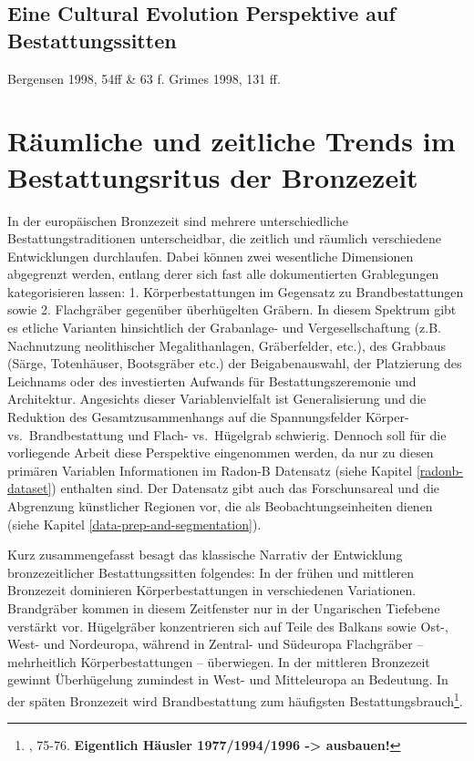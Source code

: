 \documentclass[openany,twoside,twocolumn]{book}
\let\rmarkdownfootnote\footnote%
\def\footnote{\protect\rmarkdownfootnote}
\begin{document}
\hypertarget{eine-cultural-evolution-perspektive-auf-bestattungssitten}{%
\subsection{Eine Cultural Evolution Perspektive auf
Bestattungssitten}\label{eine-cultural-evolution-perspektive-auf-bestattungssitten}}

Bergensen 1998, 54ff \& 63 f. Grimes 1998, 131 ff.

\hypertarget{raumliche-und-zeitliche-trends-im-bestattungsritus-der-bronzezeit}{%
\section{Räumliche und zeitliche Trends im Bestattungsritus der
Bronzezeit}\label{raumliche-und-zeitliche-trends-im-bestattungsritus-der-bronzezeit}}

In der europäischen Bronzezeit sind mehrere unterschiedliche
Bestattungstraditionen unterscheidbar, die zeitlich und räumlich
verschiedene Entwicklungen durchlaufen. Dabei können zwei wesentliche
Dimensionen abgegrenzt werden, entlang derer sich fast alle
dokumentierten Grablegungen kategorisieren lassen: 1. Körperbestattungen
im Gegensatz zu Brandbestattungen sowie 2. Flachgräber gegenüber
überhügelten Gräbern. In diesem Spektrum gibt es etliche Varianten
hinsichtlich der Grabanlage- und Vergesellschaftung (z.B. Nachnutzung
neolithischer Megalithanlagen, Gräberfelder, etc.), des Grabbaus (Särge,
Totenhäuser, Bootsgräber etc.) der Beigabenauswahl, der Platzierung des
Leichnams oder des investierten Aufwands für Bestattungszeremonie und
Architektur. Angesichts dieser Variablenvielfalt ist Generalisierung und
die Reduktion des Gesamtzusammenhangs auf die Spannungsfelder Körper-
vs.~Brandbestattung und Flach- vs.~Hügelgrab schwierig. Dennoch soll für
die vorliegende Arbeit diese Perspektive eingenommen werden, da nur zu
diesen primären Variablen Informationen im Radon-B Datensatz (siehe
Kapitel \ref{radonb-dataset}) enthalten sind. Der Datensatz gibt auch
das Forschunsareal und die Abgrenzung künstlicher Regionen vor, die als
Beobachtungseinheiten dienen (siehe Kapitel
\ref{data-prep-and-segmentation}).

Kurz zusammengefasst besagt das klassische Narrativ der Entwicklung
bronzezeitlicher Bestattungssitten folgendes: In der frühen und
mittleren Bronzezeit dominieren Körperbestattungen in verschiedenen
Variationen. Brandgräber kommen in diesem Zeitfenster nur in der
Ungarischen Tiefebene verstärkt vor. Hügelgräber konzentrieren sich auf
Teile des Balkans sowie Ost-, West- und Nordeuropa, während in Zentral-
und Südeuropa Flachgräber -- mehrheitlich Körperbestattungen --
überwiegen. In der mittleren Bronzezeit gewinnt Überhügelung zumindest
in West- und Mitteleuropa an Bedeutung. In der späten Bronzezeit wird
Brandbestattung zum häufigsten Bestattungsbrauch\footnote{\textcite{harding_european_2000},
  75-76. \textbf{Eigentlich Häusler 1977/1994/1996 -\textgreater{}
  ausbauen!}}.
\end{document}
